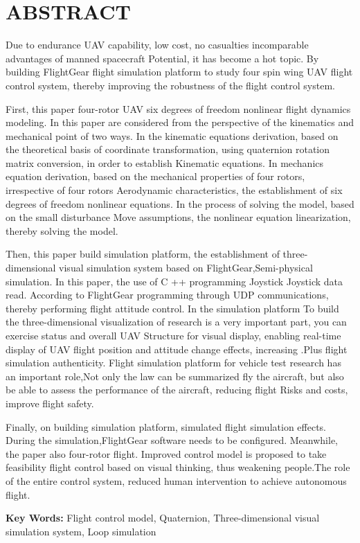 \chapter*{ABSTRACT}
\noindent 
\vspace{1em}


Due to endurance UAV capability, low cost, no casualties incomparable advantages of manned spacecraft
Potential, it has become a hot topic. By building FlightGear flight simulation platform to study four spin wing UAV flight control system, thereby improving the robustness of the flight control system.

First, this paper four-rotor UAV six degrees of freedom nonlinear flight dynamics modeling. In this paper are considered from the perspective of the kinematics and mechanical point of two ways. In the kinematic equations derivation, based on the theoretical basis of coordinate transformation, using quaternion rotation matrix conversion, in order to establish Kinematic equations. In mechanics equation derivation, based on the mechanical properties of four rotors, irrespective of four rotors Aerodynamic characteristics, the establishment of six degrees of freedom nonlinear equations. In the process of solving the model, based on the small disturbance Move assumptions, the nonlinear equation linearization, thereby solving the model.

Then, this paper build simulation platform, the establishment of three-dimensional visual simulation system based on FlightGear,Semi-physical simulation. In this paper, the use of C ++ programming Joystick Joystick data read. According to FlightGear programming through UDP communications, thereby performing flight attitude control. In the simulation platform To build the three-dimensional visualization of research is a very important part, you can exercise status and overall UAV Structure for visual display, enabling real-time display of UAV flight position and attitude change effects, increasing .Plus flight simulation authenticity. Flight simulation platform for vehicle test research has an important role,Not only the law can be summarized fly the aircraft, but also be able to assess the performance of the aircraft, reducing flight Risks and costs, improve flight safety.

Finally, on building simulation platform, simulated flight simulation effects. During the simulation,FlightGear software needs to be configured. Meanwhile, the paper also four-rotor flight. Improved control model is proposed to take feasibility flight control based on visual thinking, thus weakening people.The role of the entire control system, reduced human intervention to achieve autonomous flight.



\vspace{0.1in}
\noindent \textbf{Key Words:} Flight control model, Quaternion, Three-dimensional visual simulation system, Loop simulation
